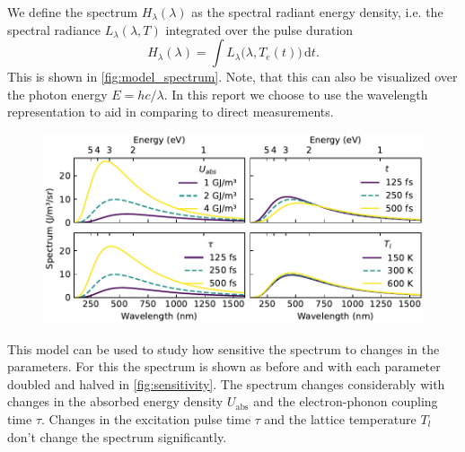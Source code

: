 \documentclass[
	parskip=half,
	a4paper,
]{scrarticle}
\begin{document}
We define the spectrum $H_\lambda(\lambda)$ as the spectral radiant energy density, i.e. the spectral radiance $L_\lambda(\lambda, T)$ integrated over the pulse duration
\begin{equation}
      H_\lambda(\lambda) = 
      \int L_\lambda\bigl(\lambda, T_e(t)\bigr)\,\mathrm dt.
\end{equation}
This is shown in \autoref{fig:model_spectrum}.
Note, that this can also be visualized over the photon energy $E = h c / \lambda$. In this report we choose to use the wavelength representation to aid in comparing to direct measurements.


\begin{figure}
    \centering
    \includegraphics{../analysis/figures/sensitivity.pdf}
    \caption{}
    \label{fig:sensitivity}
\end{figure}
This model can be used to study how sensitive the spectrum to changes in the parameters. For this the spectrum is shown as before and with each parameter doubled and halved in \autoref{fig:sensitivity}.
The spectrum changes considerably with changes in the absorbed energy density $U_\text{abs}$ and the electron-phonon coupling time $\tau$. Changes in the excitation pulse time $\tau$ and the lattice temperature $T_l$ don't change the spectrum significantly.
\end{document}
